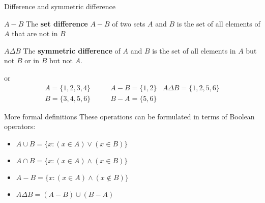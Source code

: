 \documentclass{beamer}
\def\black{\color{black}~}
\def\bl[#1]#2{\begin{block}{#1}#2\end{block}}
\begin{document}
\begin{frame}{Difference and symmetric difference}
\bl[$A-B$]{
The \textbf{set difference} $A-B$ of two sets $A$ and $B$ is the set of all elements of $A$ that are not in $B$}
\bl[$A\Delta B$]{
The \textbf{symmetric difference} of $A$ and $B$ is the set of all elements in $A$ but not $B$ or in $B$ but not $A$.
}

\begin{figure}
\center
{}
\end{figure}

or \pause
\begin{align*}
A=\{1,2,3,4\}\qquad & A- B=\{1,2\}& A\Delta B=\{1,2,5,6\}\\
B=\{3,4,5,6\}\qquad&B-A=\{5,6\} &
\end{align*}

\end{frame}



\begin{frame}{More formal definitions}
These operations can be formulated in terms of Boolean operators:
\begin{itemize}
\item $A\cup B=\{x: (x\in A)\vee (x\in B)\}$\pause
\item $A\cap B=\{x: (x\in A)\wedge (x\in B)\}$\pause
\item $A-B=\{x: (x\in A)\wedge (x\notin B)\}$\pause
\item $A\Delta B=(A-B)\cup (B-A)$
\end{itemize}
\end{frame}
\end{document}
